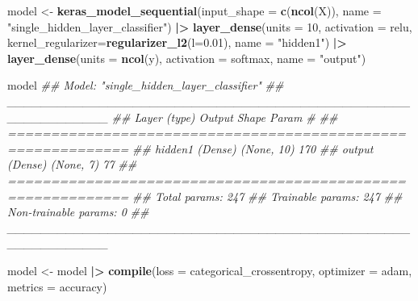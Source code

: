 \documentclass[
  notitlepage]{book}
\newenvironment{Shaded}{\begin{snugshade}}{\end{snugshade}}
\newcommand{\CommentTok}[1]{\textcolor[rgb]{0.56,0.35,0.01}{\textit{#1}}}
\newcommand{\DataTypeTok}[1]{\textcolor[rgb]{0.13,0.29,0.53}{#1}}
\newcommand{\DecValTok}[1]{\textcolor[rgb]{0.00,0.00,0.81}{#1}}
\newcommand{\ErrorTok}[1]{\textcolor[rgb]{0.64,0.00,0.00}{\textbf{#1}}}
\newcommand{\FloatTok}[1]{\textcolor[rgb]{0.00,0.00,0.81}{#1}}
\newcommand{\KeywordTok}[1]{\textcolor[rgb]{0.13,0.29,0.53}{\textbf{#1}}}
\newcommand{\NormalTok}[1]{#1}
\newcommand{\OperatorTok}[1]{\textcolor[rgb]{0.81,0.36,0.00}{\textbf{#1}}}
\newcommand{\StringTok}[1]{\textcolor[rgb]{0.31,0.60,0.02}{#1}}
\begin{document}
\begin{Shaded}
\begin{Highlighting}[]
\NormalTok{model \textless{}{-}}\StringTok{ }\KeywordTok{keras\_model\_sequential}\NormalTok{(}\DataTypeTok{input\_shape =} \KeywordTok{c}\NormalTok{(}\KeywordTok{ncol}\NormalTok{(X)), }
              \DataTypeTok{name =} \StringTok{"single\_hidden\_layer\_classifier"}\NormalTok{) }\OperatorTok{|}\ErrorTok{\textgreater{}}
\StringTok{  }\KeywordTok{layer\_dense}\NormalTok{(}\DataTypeTok{units =} \DecValTok{10}\NormalTok{, }
              \DataTypeTok{activation =} \StringTok{\textquotesingle{}relu\textquotesingle{}}\NormalTok{, }
              \DataTypeTok{kernel\_regularizer=}\KeywordTok{regularizer\_l2}\NormalTok{(}\DataTypeTok{l=}\FloatTok{0.01}\NormalTok{), }
              \DataTypeTok{name =} \StringTok{"hidden1"}\NormalTok{) }\OperatorTok{|}\ErrorTok{\textgreater{}}
\StringTok{  }\KeywordTok{layer\_dense}\NormalTok{(}\DataTypeTok{units =} \KeywordTok{ncol}\NormalTok{(y), }
              \DataTypeTok{activation =} \StringTok{\textquotesingle{}softmax\textquotesingle{}}\NormalTok{, }
              \DataTypeTok{name =} \StringTok{"output"}\NormalTok{)}

\NormalTok{model}
\CommentTok{\#\# Model: "single\_hidden\_layer\_classifier"}
\CommentTok{\#\# \_\_\_\_\_\_\_\_\_\_\_\_\_\_\_\_\_\_\_\_\_\_\_\_\_\_\_\_\_\_\_\_\_\_\_\_\_\_\_\_\_\_\_\_\_\_\_\_\_\_\_\_\_\_\_\_\_\_\_\_}
\CommentTok{\#\#  Layer (type)              Output Shape            Param \#  }
\CommentTok{\#\# ============================================================}
\CommentTok{\#\#  hidden1 (Dense)           (None, 10)              170      }
\CommentTok{\#\#  output (Dense)            (None, 7)               77       }
\CommentTok{\#\# ============================================================}
\CommentTok{\#\# Total params: 247}
\CommentTok{\#\# Trainable params: 247}
\CommentTok{\#\# Non{-}trainable params: 0}
\CommentTok{\#\# \_\_\_\_\_\_\_\_\_\_\_\_\_\_\_\_\_\_\_\_\_\_\_\_\_\_\_\_\_\_\_\_\_\_\_\_\_\_\_\_\_\_\_\_\_\_\_\_\_\_\_\_\_\_\_\_\_\_\_\_}
\end{Highlighting}
\end{Shaded}

\begin{Shaded}
\begin{Highlighting}[]
\NormalTok{model \textless{}{-}}\StringTok{ }\NormalTok{model }\OperatorTok{|}\ErrorTok{\textgreater{}}\StringTok{  }
\StringTok{  }\KeywordTok{compile}\NormalTok{(}\DataTypeTok{loss =} \StringTok{\textquotesingle{}categorical\_crossentropy\textquotesingle{}}\NormalTok{, }
          \DataTypeTok{optimizer =} \StringTok{\textquotesingle{}adam\textquotesingle{}}\NormalTok{, }
          \DataTypeTok{metrics =} \StringTok{\textquotesingle{}accuracy\textquotesingle{}}\NormalTok{)}
\end{Highlighting}
\end{Shaded}
\end{document}
